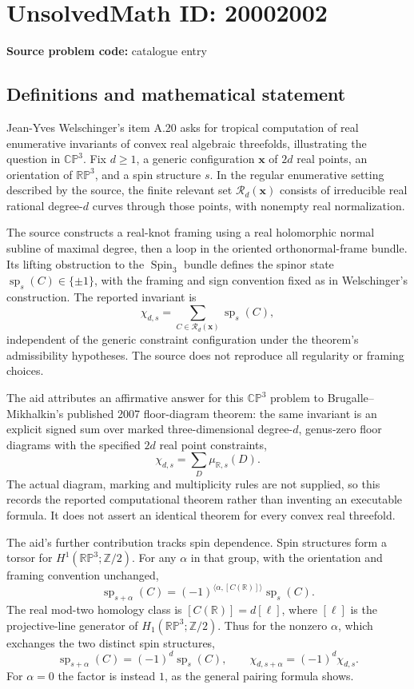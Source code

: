 \documentclass[11pt]{article}
\begin{document}
\section*{UnsolvedMath ID: 20002002}
\textbf{Source problem code:} catalogue entry
\subsection{Definitions and mathematical statement}
Jean-Yves Welschinger's item A.20 asks for tropical computation of real enumerative invariants of convex real algebraic threefolds, illustrating the question in \(\mathbb{CP}^3\). Fix \(d\geq1\), a generic configuration \(\mathbf x\) of \(2d\) real points, an orientation of \(\mathbb{RP}^3\), and a spin structure \(s\). In the regular enumerative setting described by the source, the finite relevant set \(\mathcal R_d(\mathbf x)\) consists of irreducible real rational degree-\(d\) curves through those points, with nonempty real normalization.

The source constructs a real-knot framing using a real holomorphic normal subline of maximal degree, then a loop in the oriented orthonormal-frame bundle. Its lifting obstruction to the \(\operatorname{Spin}_3\) bundle defines the spinor state \(\operatorname{sp}_s(C)\in\{\pm1\}\), with the framing and sign convention fixed as in Welschinger's construction. The reported invariant is
\[
 \chi_{d,s}=\sum_{C\in\mathcal R_d(\mathbf x)}\operatorname{sp}_s(C),
\]
independent of the generic constraint configuration under the theorem's admissibility hypotheses. The source does not reproduce all regularity or framing choices.

The aid attributes an affirmative answer for this \(\mathbb{CP}^3\) problem to Brugalle--Mikhalkin's published 2007 floor-diagram theorem: the same invariant is an explicit signed sum over marked three-dimensional degree-\(d\), genus-zero floor diagrams with the specified \(2d\) real point constraints,
\[
 \chi_{d,s}=\sum_D\mu_{\mathbb R,s}(D).
\]
The actual diagram, marking and multiplicity rules are not supplied, so this records the reported computational theorem rather than inventing an executable formula. It does not assert an identical theorem for every convex real threefold.

The aid's further contribution tracks spin dependence. Spin structures form a torsor for \(H^1(\mathbb{RP}^3;\mathbb Z/2)\). For any \(\alpha\) in that group, with the orientation and framing convention unchanged,
\[
 \operatorname{sp}_{s+\alpha}(C)=
 (-1)^{\langle\alpha,[C(\mathbb R)]\rangle}\operatorname{sp}_s(C).
\]
The real mod-two homology class is \([C(\mathbb R)]=d[\ell]\), where \([\ell]\) is the projective-line generator of \(H_1(\mathbb{RP}^3;\mathbb Z/2)\). Thus for the nonzero \(\alpha\), which exchanges the two distinct spin structures,
\[
 \operatorname{sp}_{s+\alpha}(C)=(-1)^d\operatorname{sp}_s(C),\qquad
 \chi_{d,s+\alpha}=(-1)^d\chi_{d,s}.
\]
For \(\alpha=0\) the factor is instead \(1\), as the general pairing formula shows.
\end{document}

